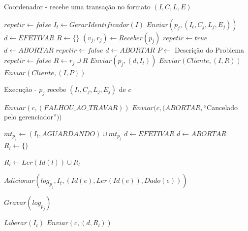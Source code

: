\documentclass[11pt,twoside,a4paper]{book}
\begin{document}
\begin{algorithm}
    \caption{Coordenador - recebe uma transação no formato $(I, C, L, E)$}
    \label{alg:mini_coordenador}
    \Inicio
    {    
        $repetir \gets false$\;
        {
            $I_t \gets GerarIdentificador(I)$\;
            {
                $Enviar(p_j, (I_t, C_j, L_j, E_j))$\;
            }
            $d \gets EFETIVAR$\;
            $R \gets \{\}$\;
            {
                $(v_j, r_j) \gets Receber(p_j)$\;
                {    
                    $repetir \gets true$\;
                    $d \gets ABORTAR$\;
                }
                {
                    $repetir \gets false$\;
                    $d \gets ABORTAR$\;
                    $P \gets$ Descrição do Problema\;
                }
                \Senao 
                {
                    $repetir \gets false$\;
                    $R \gets r_j \cup R$\;
                }
            }
            {
                $Enviar(p_j, (d, I_t))$\;
            }
        }
        {
            $Enviar(Cliente, (I, R))$\;
        }
        {
            $Enviar(Cliente, (I, P))$\;
        }
    }
\end{algorithm}

\begin{algorithm}
    \caption{Execução - $p_j$ recebe $(I_t, C_j, L_j, E_j)$ de $c$}
    \label{alg:mini_participante1}
    \Inicio
    {
        {
            $Enviar(c, (FALHOU\_AO\_TRAVAR))$\;
        }
        {
            $Enviar(c, (ABORTAR, $``Cancelado pelo gerenciador''$))$\;
        }
        \Senao
        {
            $mt_{p_j} \gets (I_t, AGUARDANDO) \cup mt_{p_j}$\;
            $d \gets EFETIVAR$\;
            {
                {
                    $d \gets ABORTAR$\;
                }
            }
            $R_l \gets \{\}$\;
            {
                {
                    $R_l \gets Ler(Id(l)) \cup R_l$\;
                }
                
                {
                    $Adicionar(log_{p_j}, I_t, (Id(e), Ler(Id(e)), Dado(e)) )$\;
                }

                $Gravar(log_{p_j})$\;
            }
            {
                $Liberar(I_t)$\;
            }
            $Enviar(c, (d, R_l))$\;
        }
    }
\end{algorithm}
\end{document}
